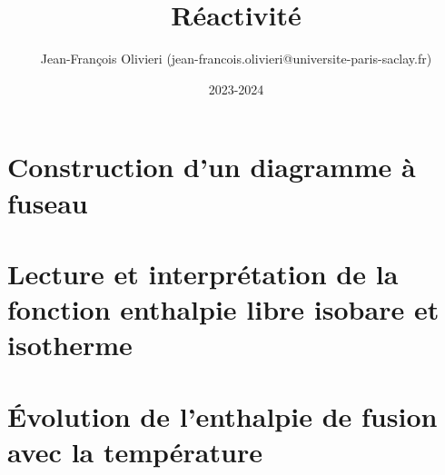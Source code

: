 \documentclass[a4paper]{article}
\title{Réactivité}
\author{Jean-François Olivieri (jean-francois.olivieri@universite-paris-saclay.fr)}
\date{2023-2024}
\theoremstyle{definition}
\newcommand*{%
\solution}[1]{}
\begin{document}

\section{Construction d'un diagramme à fuseau}
\label{ex:fuseau}

\graphicspath{{Ex01/}}


\newpage

\section{Lecture et interprétation de la fonction enthalpie libre isobare et isotherme}
\label{ex:enthalpie_libre_isoP_isoT}

\graphicspath{{Ex02/}}


\newpage


\section{\'{E}volution de l'enthalpie de fusion avec la température}
\label{ex:enthalpie_fusion_heterogene}

\graphicspath{{Ex03/}}




%
\end{document}
